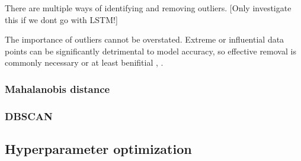There are multiple ways of identifying and removing outliers. [Only investigate this if we dont go with LSTM!] 

The importance of outliers cannot be overstated. Extreme or influential data points can be significantly detrimental to model accuracy, so effective removal is commonly necessary or at least benifitial \citep{osborne_overbay_2004}, \citep{hodge_austin_2004}. 

\subsubsection{Mahalanobis distance}

\subsubsection{DBSCAN}

\subsection{Hyperparameter optimization}



